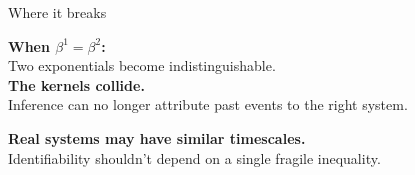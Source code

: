 \documentclass[aspectratio=169,11pt]{beamer}
\begin{document}
\begin{frame}{Where it breaks}
  \vspace{0.3cm}
  \centering
  \begin{minipage}{0.45\textwidth}
    \centering
    \textbf{When $\beta^1 = \beta^2$:}\\[0.4cm]
    Two exponentials become indistinguishable.\\[0.4cm]
    \textcolor{warn}{\bfseries The kernels collide.}\\[0.3cm]
    Inference can no longer attribute past events to the right system.
  \end{minipage}\hfill
  \begin{minipage}{0.5\textwidth}
    \centering
  \end{minipage}

  \vspace{0.7cm}
  \begin{center}
    \large \textcolor{accent}{\bfseries Real systems may have similar timescales.}\\[0.1cm]
    \textcolor{soft}{Identifiability shouldn't depend on a single fragile inequality.}
  \end{center}
\end{frame}
\end{document}
